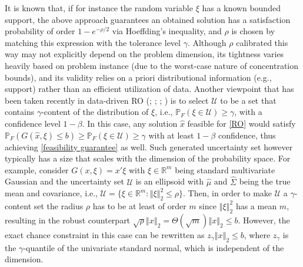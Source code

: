 \documentclass[mnsc,blindrev]{informs4} %
\newcommand{\R}{\mathbb{R}}
\newcommand{\norm}[1]{\left \Vert #1 \right\Vert}
\begin{document}
\begin{example}
It is known that, if for instance the random variable $\xi$ has a known bounded support, the above approach guarantees an obtained solution has a satisfaction probability of order $1-e^{-\rho/2}$ via Hoeffding's inequality, and $\rho$ is chosen by matching this expression with the tolerance level $\gamma$. Although $\rho$ calibrated this way may not explicitly depend on the problem dimension, its tightness varies heavily based on problem instance (due to the worst-case nature of concentration bounds), and its validity relies on a priori distributional information (e.g., support) rather than an efficient utilization of data.
Another viewpoint that has been taken recently in data-driven RO (\cite{bertsimas2018data}; \cite{tulabandhula2014robust}; \cite{goldfarb2003robust}; \cite{hong2017learning}) is to select $\mathcal U$ to be a set that contains $\gamma$-content of the distribution of $\xi$, i.e., $\mathbb P_F(\xi\in\mathcal U)\geq\gamma$, with a confidence level $1-\beta$. In this case, any solution $\hat x$ feasible for \eqref{RO} would satisfy $\mathbb P_F(G(\hat x,\xi)\leq b)\geq\mathbb P_F(\xi\in\mathcal U)\geq\gamma$ with at least $1-\beta$ confidence, thus achieving \eqref{feasibility guarantee} as well. Such generated uncertainty set however typically has a size that scales with the dimension of the probability space. For example, consider $G(x,\xi)=x'\xi$ with $\xi\in \R^m$ being standard multivariate Gaussian and the uncertainty set $\mathcal U$ is an ellipsoid with $\hat{\mu}$ and $\hat{\Sigma}$ being the true mean and covariance, i.e., $\mathcal U=\{\xi\in\R^m:\norm{\xi}_2^2\leq \rho\}$. Then, in order to make $\mathcal U$ a $\gamma$-content set the radius $\rho$ has to be at least of order $m$ since $\norm{\xi}_2^2$ has a mean $m$, resulting in the robust counterpart $\sqrt{\rho}\norm{x}_2=\Theta(\sqrt{m})\norm{x}_2 \leq b$. However, the exact chance constraint in this case can be rewritten as $z_{\gamma}\norm{x}_2 \leq b$, where $z_{\gamma}$ is the $\gamma$-quantile of the univariate standard normal, which is independent of the dimension.\hfill\halmos


%

%

\end{example}
\end{document}
